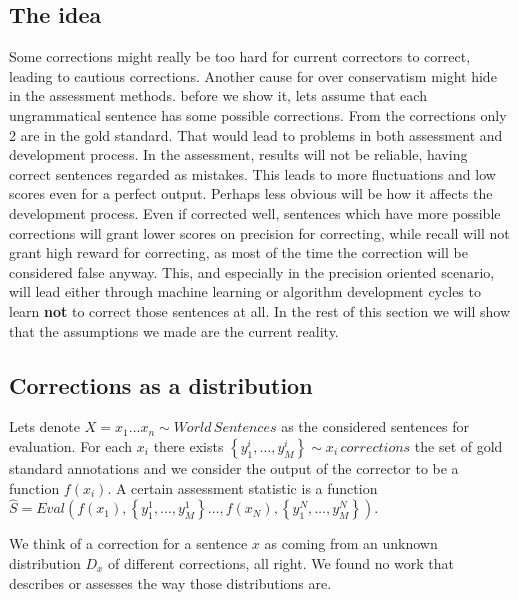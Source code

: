 \documentclass[english]{article}
\begin{document}
\subsection{The idea}

Some corrections might really be too hard for current correctors to
correct, leading to cautious corrections. Another cause for over conservatism
might hide in the assessment methods. before we show it, lets assume
that each ungrammatical sentence has some possible corrections. From
the corrections only 2 are in the gold standard. That would lead to
problems in both assessment and development process. In the assessment,
results will not be reliable, having correct sentences regarded as mistakes. This leads to more fluctuations and low scores even for a perfect output.
Perhaps less obvious will be how it affects the development
process. Even if corrected well, sentences which have more possible
corrections will grant lower scores on precision for correcting, while recall will not grant high reward for correcting, as most of the time the correction will be considered false anyway. This, and especially in the precision oriented scenario, will lead either through
machine learning or algorithm development cycles to learn \textbf{not} to correct
those sentences at all. In the rest of this section we will show that
the assumptions we made are the current reality.

\subsection{Corrections as a distribution}

Lets denote $X=x_{1}\ldots x_{n}\sim World\,Sentences$ as the considered
sentences for evaluation. For each $x_{i}$ there exists $\left\{ y_{1}^{i},\ldots,y_{M}^{i}\right\} \sim x_{i}\,corrections$
the set of gold standard annotations and we consider the output of
the corrector to be a function $f\left(x_{i}\right)$. A certain assessment
statistic is a function $\hat{S}=Eval\left(f\left(x_{1}\right),\left\{ y_{1}^{1},\ldots,y_{M}^{1}\right\} \ldots,f\left(x_{N}\right),\left\{ y_{1}^{N},\ldots,y_{M}^{N}\right\} \right)$.

We think of a correction for a sentence $x$ as coming from an unknown distribution $D_x$ of different corrections, all right. We found no work that describes or assesses the way those distributions are. 
\end{document}
